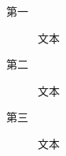 \documentclass{ctexart}
\begin{document}
  \begin{description}
    \item[第一] 文本
    \item[第二] 文本
    \item[第三] 文本
  \end{description}
\end{document}
